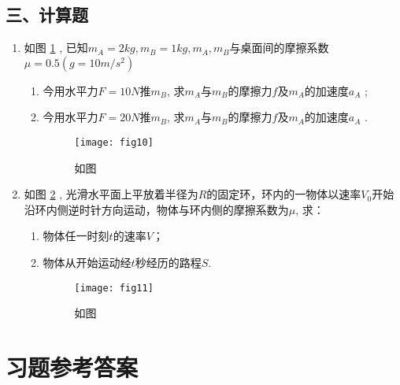 \subsection*{三、计算题}
\begin{enumerate}
    \item 如图 \ref{fig:10} , 已知$m_A=2kg, m_B=1kg, m_A, m_B$与桌面间的摩擦系数$\mu=0.5(g=10m/s^2)$
    \begin{enumerate}
    \item[(1)] 今用水平力$F=10N$推$m_B$, 求$m_A$与$m_B$的摩擦力$f$及$m_A$的加速度$a_A$ ;
    \item[(2)] 今用水平力$F=20N$推$m_B$, 求$m_A$与$m_B$的摩擦力$f$及$m_A$的加速度$a_A$ .
        \begin{figure}[H]
            \centering
            \texttt{[image: fig10]}
            \caption{如图}\label{fig:10}
        \end{figure}
    \end{enumerate}
    \item 如图 \ref{fig:11} , 光滑水平面上平放着半径为$R$的固定环，环内的一物体以速率$V_0$开始沿环内侧逆时针方向运动，物体与环内侧的摩擦系数为$\mu$, 求：
    \begin{enumerate}
        \item[(1)] 物体任一时刻$t$的速率$V$；                                            
        \item[(2)] 物体从开始运动经$t$秒经历的路程$S$.
        \begin{figure}[H]
            \centering
            \texttt{[image: fig11]}
            \caption{如图}\label{fig:11}
        \end{figure} 
    \end{enumerate}
\end{enumerate}

\section{习题参考答案}
